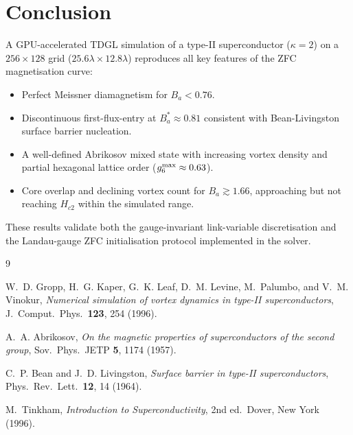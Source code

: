 \documentclass[11pt,a4paper]{article}
\newcommand{\Hctwo}{H_{c2}}
\newcommand{\kGL}{\kappa}
\newcommand{\Ba}{B_a}
\newcommand{\lam}{\lambda}
\begin{document}
\section{Conclusion}

A GPU-accelerated TDGL simulation of a type-II superconductor ($\kGL = 2$)
on a $256\times128$ grid ($25.6\lam\times12.8\lam$) reproduces all key
features of the ZFC magnetisation curve:

\begin{itemize}
  \item Perfect Meissner diamagnetism for $\Ba < 0.76$.
  \item Discontinuous first-flux-entry at $\Ba^* \approx 0.81$ consistent
        with Bean-Livingston surface barrier nucleation.
  \item A well-defined Abrikosov mixed state with increasing vortex density
        and partial hexagonal lattice order ($g_6^{\rm max} \approx 0.63$).
  \item Core overlap and declining vortex count for $\Ba \gtrsim 1.66$,
        approaching but not reaching $\Hctwo$ within the simulated range.
\end{itemize}

These results validate both the gauge-invariant link-variable discretisation
and the Landau-gauge ZFC initialisation protocol implemented in the solver.

\begin{thebibliography}{9}

  W.~D. Gropp, H.~G. Kaper, G.~K. Leaf, D.~M. Levine, M.~Palumbo, and
  V.~M. Vinokur,
  \textit{Numerical simulation of vortex dynamics in type-II superconductors},
  J.\ Comput.\ Phys.\ \textbf{123}, 254 (1996).

  A.~A. Abrikosov,
  \textit{On the magnetic properties of superconductors of the second group},
  Sov.\ Phys.\ JETP \textbf{5}, 1174 (1957).

  C.~P. Bean and J.~D. Livingston,
  \textit{Surface barrier in type-II superconductors},
  Phys.\ Rev.\ Lett.\ \textbf{12}, 14 (1964).

  M.~Tinkham,
  \textit{Introduction to Superconductivity}, 2nd ed.\
  Dover, New York (1996).

\end{thebibliography}
\end{document}
